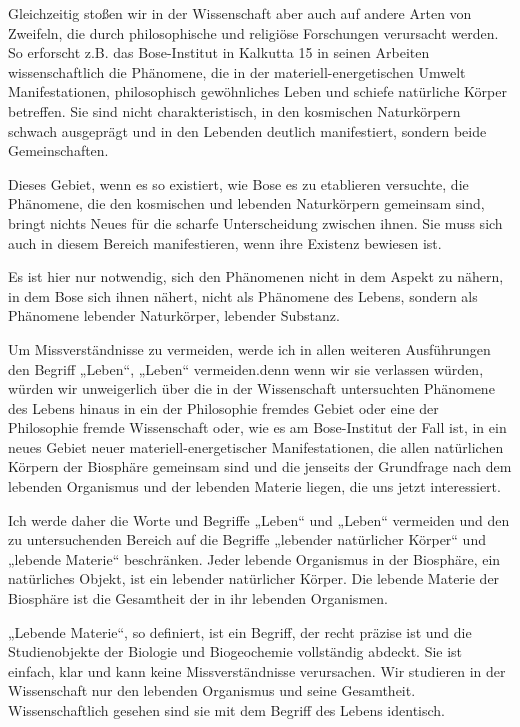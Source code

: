 \documentclass[11pt,a4paper]{book}
\begin{document}
Gleichzeitig stoßen wir in der Wissenschaft aber auch auf andere Arten von
Zweifeln, die durch philosophische und religiöse Forschungen verursacht
werden. So erforscht z.B. das Bose-Institut in Kalkutta 15 in seinen Arbeiten
wissenschaftlich die Phänomene, die in der materiell-energetischen Umwelt
Manifestationen, philosophisch gewöhnliches Leben und schiefe natürliche
Körper betreffen. Sie sind nicht charakteristisch, in den kosmischen
Naturkörpern schwach ausgeprägt und in den Lebenden deutlich manifestiert,
sondern beide Gemeinschaften.

Dieses Gebiet, wenn es so existiert, wie Bose es zu etablieren versuchte, die
Phänomene, die den kosmischen und lebenden Naturkörpern gemeinsam sind, bringt
nichts Neues für die scharfe Unterscheidung zwischen ihnen. Sie muss sich auch
in diesem Bereich manifestieren, wenn ihre Existenz bewiesen ist.

Es ist hier nur notwendig, sich den Phänomenen nicht in dem Aspekt zu nähern,
in dem Bose sich ihnen nähert, nicht als Phänomene des Lebens, sondern als
Phänomene lebender Naturkörper, lebender Substanz.

Um Missverständnisse zu vermeiden, werde ich in allen weiteren Ausführungen
den Begriff „Leben“, „Leben“ vermeiden.denn wenn wir sie verlassen würden,
würden wir unweigerlich über die in der Wissenschaft untersuchten Phänomene
des Lebens hinaus in ein der Philosophie fremdes Gebiet oder eine der
Philosophie fremde Wissenschaft oder, wie es am Bose-Institut der Fall ist, in
ein neues Gebiet neuer materiell-energetischer Manifestationen, die allen
natürlichen Körpern der Biosphäre gemeinsam sind und die jenseits der
Grundfrage nach dem lebenden Organismus und der lebenden Materie liegen, die
uns jetzt interessiert.

Ich werde daher die Worte und Begriffe „Leben“ und „Leben“ vermeiden und den
zu untersuchenden Bereich auf die Begriffe „lebender natürlicher Körper“ und
„lebende Materie“ beschränken. Jeder lebende Organismus in der Biosphäre, ein
natürliches Objekt, ist ein lebender natürlicher Körper. Die lebende Materie
der Biosphäre ist die Gesamtheit der in ihr lebenden Organismen.

„Lebende Materie“, so definiert, ist ein Begriff, der recht präzise ist und
die Studienobjekte der Biologie und Biogeochemie vollständig abdeckt. Sie ist
einfach, klar und kann keine Missverständnisse verursachen. Wir studieren in
der Wissenschaft nur den lebenden Organismus und seine Gesamtheit.
Wissenschaftlich gesehen sind sie mit dem Begriff des Lebens identisch.
\end{document}
